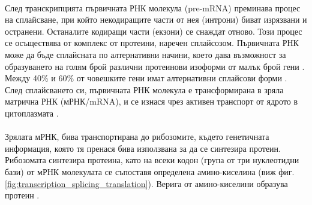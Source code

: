 \documentclass[pdftex,cyrillic,14pt,a4page,twoside,openright]{extreport}
\begin{document}
\paragraph{}
След транскрипцията първичната РНК молекула (pre-mRNA) преминава процес на сплайсване, при който некодиращите части от нея (интрони) биват изрязвани и остранени. Останалите кодиращи части (екзони) се снаждат отново. Този процес се осъществява от комплекс от протеини, наречен сплайсозом. Първичната РНК може да бъде сплайсната по алтернативни начини, което дава възможност за образуването на голям брой различни протеинови изоформи от малък брой гени \cite{stamm2005}. Между 40\% и 60\% от човешките гени имат алтернативни сплайсови форми \cite{modrek2002}. След сплайсването си, първичната РНК молекула е трансформирана в зряла матрична РНК (мРНК/mRNA), и се изнася чрез активен транспорт от ядрото в цитоплазмата \cite{siebrasse2012}.

\paragraph{}
Зрялата мРНК, бива транспортирана до рибозомите, където генетичната информация, която тя пренася бива използвана за да се синтезира протеин. Рибозомата синтезира протеина, като на всеки кодон (група от три нуклеотидни бази) от мРНК молекулата се съпоставя определена амино-киселина (виж фиг. \ref{fig:transcription_splicing_translation}). Верига от амино-киселини образува протеин \cite{klug2014translation}.
\end{document}
